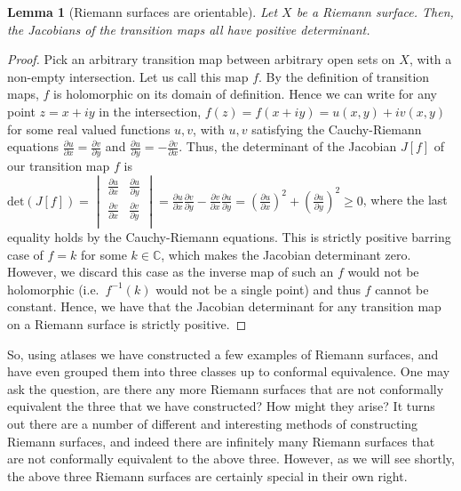 \documentclass[11pt]{report}
\newtheorem{lemma}[thm]{Lemma}
\theoremstyle{definition}
\begin{document}
\begin{lemma}[Riemann surfaces are orientable]
  Let $X$ be a Riemann surface. Then, the Jacobians of the transition maps all have positive determinant.
\end{lemma}
\begin{proof}
  Pick an arbitrary transition map between arbitrary open sets on $X$, with a non-empty intersection. Let us call this map $f$. By the definition of transition maps, $f$ is holomorphic on its domain of definition. Hence we can write for any point $z=x+iy$ in the intersection, $f(z) = f(x+iy)=u(x,y)+iv(x,y)$ for some real valued functions $u,v$, with $u,v$ satisfying the Cauchy-Riemann equations $\frac{\partial u}{\partial x} = \frac{\partial v}{\partial y}$ and $\frac{\partial u}{\partial y} = -\frac{\partial v}{\partial x}$. 
  Thus, the determinant of the Jacobian $J[f]$ of our transition map $f$ is 
  $\text{det}(J[f])=\begin{vmatrix}
    \frac{\partial u}{\partial x} & \frac{\partial u}{\partial y} \\
    \frac{\partial v}{\partial x} & \frac{\partial v}{\partial y} \\
  \end{vmatrix} = \frac{\partial u}{\partial x}\frac{\partial v}{\partial y} -  \frac{\partial v}{\partial x}\frac{\partial u}{\partial y}= (\frac{\partial u}{\partial x})^2 + (\frac{\partial u}{\partial y})^2 \geq 0$, where the last equality holds by the Cauchy-Riemann equations. This is strictly positive barring case of $f=k$ for some $k\in \mathbb{C}$, which makes the Jacobian determinant zero. However, we discard this case as the inverse map of such an $f$ would not be holomorphic (i.e.\ $f^{-1}(k)$ would not be a single point) and thus $f$ cannot be constant. Hence, we have that the Jacobian determinant for any transition map on a Riemann surface is strictly positive.
\end{proof}

So, using atlases we have constructed a few examples of Riemann surfaces, and have even grouped them into three classes up to conformal equivalence.
One may ask the question, are there any more Riemann surfaces that are not conformally equivalent the three that we have constructed? How might they arise? It turns out there are a number of different and interesting methods of constructing Riemann surfaces, and indeed there are infinitely many Riemann surfaces that are not conformally equivalent to the above three. However, as we will see shortly, the above three Riemann surfaces are certainly special in their own right.
\end{document}
